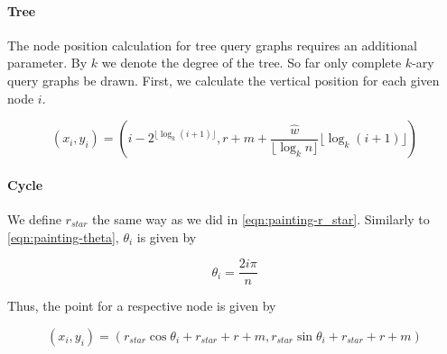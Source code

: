 \paragraph{Tree}

The node position calculation for tree query graphs requires an additional parameter. 
By $k$ we denote the degree of the tree. So far only complete $k$-ary query graphs be drawn.
First, we calculate the vertical position for each given node $i$.

\begin{equation}
    (x_i, y_i) = (i - 2^{\lfloor \log_k(i+1) \rfloor}, r + m + \frac{\hat{w}}{\lfloor \log_kn \rfloor} \lfloor \log_k(i + 1) \rfloor)
\end{equation}

\paragraph{Cycle} 

We define $r_{star}$ the same way as we did in \eqref{eqn:painting-r_star}.
Similarly to \eqref{eqn:painting-theta}, $\theta_i$ is given by

\begin{equation}\label{eqn:painting-theta_cycle}
    \theta_i = \frac{2i\pi}{n}
\end{equation}

Thus, the point for a respective node is given by

\begin{equation}
    (x_i, y_i) = (r_{star}\cos{\theta_i} + r_{star} + r + m, r_{star}\sin{\theta_i} + r_{star} + r + m)
\end{equation}